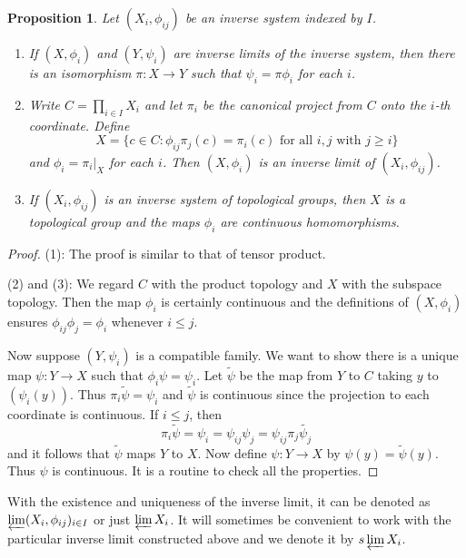 \documentclass[12pt]{report}
\newtheorem{proposition}[theorem]{Proposition}
{\theoremstyle{remark}\newtheorem*{remark}{Remark}}
\theoremstyle{definition}
\begin{document}
\begin{proposition}
	Let $(X_i,\phi_{ij})$ be an inverse system indexed by $I$.
	\begin{enumerate}
		\item If $(X,\phi_i)$ and $(Y,\psi_i)$ are inverse limits of the inverse system, then there is an isomorphism $\pi: X\to Y$ such that $\psi_i=\pi\phi_i$ for each $i$.
		\item Write $C=\prod_{i\in I} X_i$ and let $\pi_i$ be the canonical project from $C$ onto the $i$-th coordinate. Define $$X=\{c\in C: \phi_{ij}\pi_j(c)=\pi_i(c) \mbox{ for all }i,j \mbox{ with }j\geq i\}$$ and $\phi_i=\pi_i|_X$ for each $i$. Then $(X,\phi_i)$ is an inverse limit of  $(X_i,\phi_{ij})$.
		\item If  $(X_i,\phi_{ij})$ is an inverse system of topological groups, then $X$ is a topological group and the maps $\phi_i$ are continuous homomorphisms.
	\end{enumerate}
\end{proposition}
\begin{proof}
	(1): The proof is similar to that of tensor product.


	(2) and (3): We regard $C$ with the product topology and $X$ with the subspace topology. Then the map $\phi_i$ is certainly continuous and the definitions of $(X,\phi_i)$ ensures $\phi_{ij}\phi_j=\phi_i$ whenever $i\leq j$.


	Now suppose $(Y,\psi_i)$ is a compatible family. We want to show there is a unique map $\psi:Y\to X$ such that $\phi_i\psi=\psi_i$. Let $\tilde{\psi}$ be the map from $Y$ to $C$ taking $y$ to $(\psi_i(y))$. Thus $\pi_i\tilde{\psi}=\psi_i$ and $\tilde{\psi}$ is continuous since the projection to each coordinate is continuous. If $i\leq j$, then $$\pi_i\tilde{\psi}=\psi_i=\psi_{ij}\psi_j=\psi_{ij}\pi_j\tilde{\psi_j}$$ and it follows that $\tilde{\psi}$ maps $Y$ to $X$. Now define $\psi: Y\to X$ by $\psi(y)=\tilde{\psi}(y)$. Thus $\psi$ is continuous. It is a routine to check all the properties.
\end{proof}

With the existence and uniqueness of the inverse limit, it can be denoted as $\varprojlim(X_i,\phi_{ij})_{i\in I}$ or just $\varprojlim X_i$. It will sometimes be convenient to work with the particular inverse limit constructed above and we denote it by $s\varprojlim X_i$.
\end{document}

